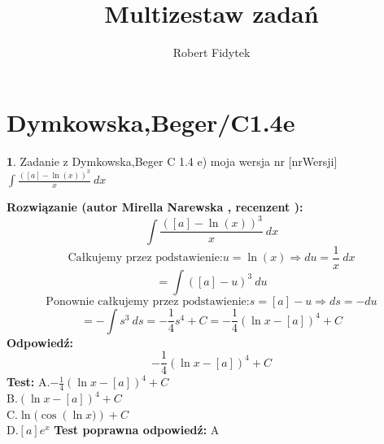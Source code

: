 \documentclass[12pt, a4paper]{article}
\title{Multizestaw zadań}
\author{Robert Fidytek}
\date{}
\theoremstyle{definition} %
\newtheorem{zad}{}
\newcommand{\kategoria}[1]{\section{#1}} %
\newcommand{\zadStart}[1]{\begin{zad}#1\newline} %
\newcommand{\zadStop}{\end{zad}}   %
\newcommand{\rozwStart}[2]{\noindent \textbf{Rozwiązanie (autor #1 , recenzent #2): }\newline} %
\newcommand{\odpStart}{\noindent \textbf{Odpowiedź:}\newline}    %
\newcommand{\odpStop}{\newline}                                             %
\newcommand{\testStart}{\noindent \textbf{Test:}\newline} %
\newcommand{\testStop}{\newline} %
\newcommand{\kluczStart}{\noindent \textbf{Test poprawna odpowiedź:}\newline} %
\newcommand{\kluczStop}{\newline} %
\begin{document}
\maketitle



\kategoria{Dymkowska,Beger/C1.4e}
\zadStart{Zadanie z Dymkowska,Beger C 1.4 e) moja wersja nr [nrWersji]}
 $\displaystyle \int \frac{([a]-\ln(x))^3}{x} \ dx$
\zadStop
\rozwStart{Mirella Narewska}{}
$$\int \frac{([a]-\ln(x))^3}{x} \ dx$$
$$\text{Całkujemy przez podstawienie:} u=\ln(x)\Rightarrow du=\frac{1}{x}  \ dx$$
$$=\int([a]-u)^3 \ du$$
$$\text{Ponownie całkujemy przez podstawienie:}s=[a]-u \Rightarrow ds=-du$$
$$=-\int s^3 \ ds=-\frac{1}{4}s^4+C=-\frac{1}{4}(\ln{x}-[a])^4+C$$
\odpStart
$$-\frac{1}{4}(\ln{x}-[a])^4+C$$
\odpStop
\testStart
A.$-\frac{1}{4}(\ln{x}-[a])^4+C$
\\
B.$(\ln{x}-[a])^4+C$
\\
C.$\ln({\cos({\ln{x})})}+C$
\\
D.$[a]e^{x}$
\testStop
\kluczStart
A
\kluczStop
\end{document}
